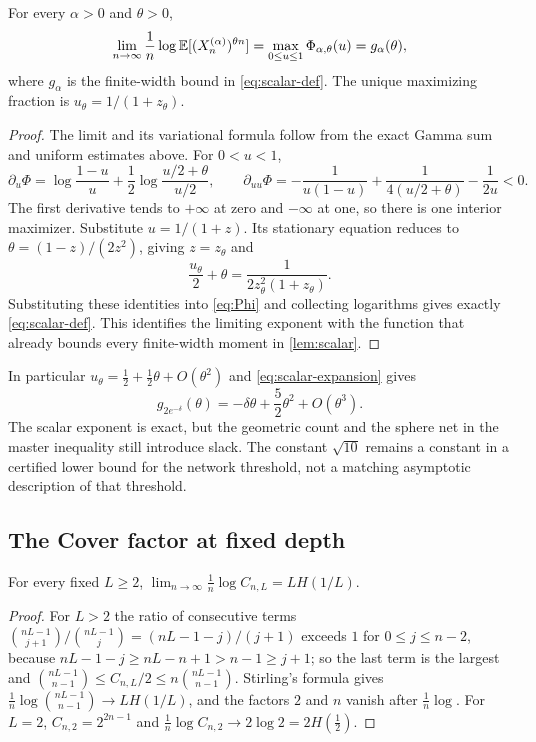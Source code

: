 \begin{proposition}\label{prop:exact}
For every $\alpha>0$ and $\theta>0$,
\[
\lim_{n\to\infty}\frac1n\log\mathbb{E}[(X_n^{(\alpha)})^{\theta n}]
=\max_{0\le u\le1}\Phi_{\alpha,\theta}(u)=g_\alpha(\theta),
\]
where $g_\alpha$ is the finite-width bound in \cref{eq:scalar-def}. The unique maximizing fraction is $u_\theta=1/(1+z_\theta)$.
\end{proposition}

\begin{proof}
The limit and its variational formula follow from the exact Gamma sum and uniform estimates above. For $0<u<1$,
\[
\partial_u\Phi=\log\frac{1-u}{u}+\frac12\log\frac{u/2+\theta}{u/2},\qquad
\partial_{uu}\Phi=-\frac1{u(1-u)}+\frac1{4(u/2+\theta)}-\frac1{2u}<0.
\]
The first derivative tends to $+\infty$ at zero and $-\infty$ at one, so there is one interior maximizer. Substitute $u=1/(1+z)$. Its stationary equation reduces to $\theta=(1-z)/(2z^2)$, giving $z=z_\theta$ and
\[
\frac{u_\theta}2+\theta=\frac1{2z_\theta^2(1+z_\theta)}.
\]
Substituting these identities into \cref{eq:Phi} and collecting logarithms gives exactly \cref{eq:scalar-def}. This identifies the limiting exponent with the function that already bounds every finite-width moment in \cref{lem:scalar}.
\end{proof}

In particular $u_\theta=\tfrac12+\tfrac12\theta+O(\theta^2)$ and \cref{eq:scalar-expansion} gives
\begin{equation}\label{eq:g-expansion}
g_{2e^{-\delta}}(\theta)=-\delta\theta+\frac52\theta^2+O(\theta^3).
\end{equation}
The scalar exponent is exact, but the geometric count and the sphere net in the master inequality still introduce slack. The constant $\sqrt{10}$ remains a constant in a certified lower bound for the network threshold, not a matching asymptotic description of that threshold.

\subsection{The Cover factor at fixed depth}

\begin{lemma}\label{lem:C-rate}
For every fixed $L\ge2$, $\lim_{n\to\infty}\frac1n\log C_{n,L}=LH(1/L)$.
\end{lemma}

\begin{proof}
For $L>2$ the ratio of consecutive terms $\binom{nL-1}{j+1}/\binom{nL-1}{j}=(nL-1-j)/(j+1)$ exceeds $1$ for $0\le j\le n-2$, because $nL-1-j\ge nL-n+1>n-1\ge j+1$; so the last term is the largest and $\binom{nL-1}{n-1}\le C_{n,L}/2\le n\binom{nL-1}{n-1}$. Stirling's formula gives $\frac1n\log\binom{nL-1}{n-1}\to LH(1/L)$, and the factors $2$ and $n$ vanish after $\frac1n\log$. For $L=2$, $C_{n,2}=2^{2n-1}$ and $\frac1n\log C_{n,2}\to2\log2=2H(\tfrac12)$.
\end{proof}

